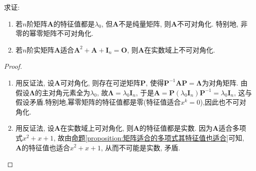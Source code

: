 \documentclass[../../main.tex]{subfiles}%
\begin{document}
\begin{proposition}\label{proposition-0.10}
求证:
\begin{enumerate}[(1)]
\item 若\(n\)阶矩阵\(\boldsymbol{A}\)的特征值都是\(\lambda_0\), 但\(\boldsymbol{A}\)不是纯量矩阵, 则\(\boldsymbol{A}\)不可对角化. 特别地, 非零的幂零矩阵不可对角化.

\item 若\(n\)阶实矩阵\(\boldsymbol{A}\)适合\(\boldsymbol{A}^2 + \boldsymbol{A} + \boldsymbol{I}_n = \boldsymbol{O}\), 则\(\boldsymbol{A}\)在实数域上不可对角化.
\end{enumerate}
\end{proposition}
\begin{proof}
\begin{enumerate}[(1)]
\item 用反证法, 设\(\boldsymbol{A}\)可对角化, 则存在可逆矩阵\(\boldsymbol{P}\), 使得\(\boldsymbol{P}^{-1}\boldsymbol{A}\boldsymbol{P} = \boldsymbol{\Lambda}\)为对角矩阵. 由假设\(\boldsymbol{\Lambda}\)的主对角元素全为\(\lambda_0\), 故\(\boldsymbol{\Lambda} = \lambda_0\boldsymbol{I}_n\), 于是\(\boldsymbol{A} = \boldsymbol{P}(\lambda_0\boldsymbol{I}_n)\boldsymbol{P}^{-1} = \lambda_0\boldsymbol{I}_n\), 这与假设矛盾.特别地,幂零矩阵的特征值都是零(特征值适合$x^k=0$),因此也不可对角化.

\item 用反证法, 设\(\boldsymbol{A}\)在实数域上可对角化, 则\(\boldsymbol{A}\)的特征值都是实数. 因为\(\boldsymbol{A}\)适合多项式\(x^2 + x + 1\), 故由\hyperref[proposition:矩阵适合的多项式其特征值也适合]{命题\ref{proposition:矩阵适合的多项式其特征值也适合}}可知, \(\boldsymbol{A}\)的特征值也适合\(x^2 + x + 1\), 从而不可能是实数, 矛盾.
\end{enumerate}
\end{proof}
\end{document}
